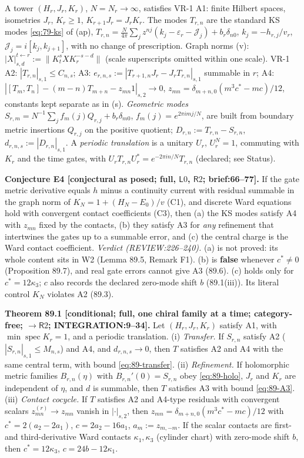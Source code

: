 A tower \((H_r,J_r,K_r)\), \(N=N_r\to\infty\), satisfies VR-1 A1: finite Hilbert spaces, isometries \(J_r\),
\(K_r\ge1\), \(K_{r+1}J_r=J_rK_r\).  The modes \(T_{r,n}\) are the standard KS modes \eqref{eq:79-ks} of (ap),
\(T_{r,n}=\frac N{4\pi}\sum_jz^{nj}(k_j-\varepsilon_r-\mathcal J_j)+b_r\delta_{n0}\), \(k_j=-h_{r,j}/v_r\),
\(\mathcal J_j=i[k_j,k_{j+1}]\), with no change of prescription.  Graph norms (v):
\(|X|_{s,d}^{t\leftarrow r}:=\|K_t^sXK_r^{-s-d}\|\) (scale superscripts omitted within one scale).  VR-1 A2:
\(|T_{r,n}|_{s,1}\le C_{n,s}\); A3: \(e_{r,n,s}:=|T_{r+1,n}J_r-J_rT_{r,n}|_{s,1}\) summable in \(r\); A4:
\(|[T_m,T_n]-(m-n)T_{m+n}-z_{mn}1|_{s,2}\to0\), \(z_{mn}=\delta_{m+n,0}(m^3c^*-mc)/12\), constants kept separate
as in (s).  \emph{Geometric modes} \(S_{r,m}=N^{-1}\sum_jf_m(j)Q_{r,j}+b_r\delta_{m0}\), \(f_m(j)=e^{2\pi imj/N}\), are
built from boundary metric insertions \(Q_{r,j}\) on the positive quotient; \(D_{r,n}:=T_{r,n}-S_{r,n}\),
\(d_{r,n,s}:=|D_{r,n}|_{s,1}\).  A \emph{periodic translation} is a unitary \(U_r\), \(U_r^{N}=1\), commuting with
\(K_r\) and the time gates, with \(U_rT_{r,n}U_r^*=e^{-2\pi in/N}T_{r,n}\) (declared; see Status).

\textbf{Conjecture E4 [conjectural as posed; full, \(\mathsf L0\), \(\mathsf R2\); brief:66--77].}  If the gate metric
derivative equals \(h\) minus a continuity current with residual summable in the graph norm of
\(K_N=1+(H_N-E_0)/v\) (C1), and discrete Ward equations hold with convergent contact coefficients (C3), then (a)
the KS modes satisfy A4 with \(z_{mn}\) fixed by the contacts, (b) they satisfy A3 for \emph{any} refinement that
intertwines the gates up to a summable error, and (c) the central charge is the Ward contact coefficient.
\emph{Verdict (REVIEW:226--240).}  (a) is not proved: its whole content sits in W2 (Lemma 89.5, Remark F1).
(b) is \textbf{false} whenever \(c^*\neq0\) (Proposition 89.7), and real gate errors cannot give A3 (89.6).
(c) holds only for \(c^*=12\kappa_3\); \(c\) also records the declared zero-mode shift \(b\) (89.1(iii)).  Its
literal control \(K_N\) violates A2 (89.3).

\textbf{Theorem 89.1 [conditional; full, one chiral family at a time; category-free; \(\to\mathsf R2\);
INTEGRATION:9--34].}  Let \((H_r,J_r,K_r)\) satisfy A1, with \(\min\operatorname{spec}K_r=1\), and a periodic translation.
(i) \emph{Transfer.} If \(S_{r,n}\) satisfy A2 (\(|S_{r,n}|_{s,1}\le M_{n,s}\)) and A4, and \(d_{r,n,s}\to0\), then
\(T\) satisfies A2 and A4 with the same central term, with bound \eqref{eq:89-transfer}.
(ii) \emph{Refinement.} If holomorphic metric families \(B_{r,n}(\eta)\) with \(B_{r,n}'(0)=S_{r,n}\) obey
\eqref{eq:89-holo}, \(J_r\) and \(K_r\) are independent of \(\eta\), and \(d\) is summable, then \(T\) satisfies A3 with
bound \eqref{eq:89-A3}.
(iii) \emph{Contact cocycle.} If \(T\) satisfies A2 and A4-type residuals with convergent scalars
\(z^{(r)}_{mn}\to z_{mn}\) vanish in \(|\cdot|_{s,2}\), then \(z_{mn}=\delta_{m+n,0}(m^3c^*-mc)/12\) with
\(c^*=2(a_2-2a_1)\), \(c=2a_2-16a_1\), \(a_m:=z_{m,-m}\).  If the scalar contacts are first- and third-derivative
Ward contacts \(\kappa_1,\kappa_3\) (cylinder chart) with zero-mode shift \(b\), then \(c^*=12\kappa_3\),
\(c=24b-12\kappa_1\).

